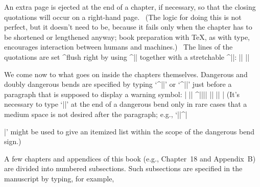 An extra page is ejected at the end of a chapter, if necessary, so
that the closing quotations will occur on a right-hand page. \ (The
logic for doing this is not perfect, but it doesn't need to be, because
it fails only when the chapter has to be shortened or lengthened anyway;
book preparation with \TeX, as with type, encourages interaction between
humans and machines.) \
The lines of the quotations are set ^{flush right} by using
^|\obeylines| together with a stretchable ^|\leftskip|:
\beginlines
|\outer\def\endchapter{\ifodd\pageno \else\vfill|^|\eject||\null\fi|
|  \begingroup\bigskip\vfill %
|  \def\eject{|^|\endgroup||\eject} %
|  \def\par{\ifhmode\/\endgraf\fi}\obeylines|
|  \def|^|\TeX||{T\kern-.2em\lower.5ex\hbox{E}X}|
|  \eightpoint \let\tt=\ninett \baselineskip=10pt |^|\interlinepenalty||=10000|
|  \leftskip=0pt plus 40pc minus \parindent |^|\parfillskip||=0pt|
|  \let|^|\rm||=\eightss \let|^|\sl||=\eightssi \everypar{\sl}}|
|\def\author#1(#2){\smallskip\noindent\rm--- #1|^|\unskip|^|\enspace||(#2)}|
\endlines

We come now to what goes on inside the chapters themselves. Dangerous and
doubly dangerous bends are specified by typing `^|\danger|' or `^|\ddanger|'
just before a paragraph that is supposed to display a warning symbol:
\beginlines
|\def\dbend{{\manual\char127}} %
|\def\d@nger{\medbreak|^|\begingroup|^|\clubpenalty||=10000|
|  \def\par{|^|\endgraf|^|\endgroup|^|\medbreak||} |%
  ^|\noindent|^|\hang|^|\hangafter||=-2|
|  \hbox to0pt{\hskip-\hangindent\dbend\hfill}|^|\ninepoint||}|
^|\outer||\def\danger{\d@nger}|
|\def\dd@nger{\medbreak\begingroup\clubpenalty=10000|
|  \def\par{\endgraf\endgroup\medbreak} \noindent\hang\hangafter=-2|
|  \hbox to0pt{\hskip-\hangindent\dbend\kern1pt\dbend\hfill}\ninepoint}|
|\outer\def\ddanger{\dd@nger}|
|\def\enddanger{\endgraf\endgroup} %
\endlines
(It's necessary to type `|\enddanger|' at the end of a dangerous bend
only in rare cases that a medium space is not desired after the paragraph;
e.g., `|\smallskip|^|\item|' might be used to give an itemized list within
the scope of the dangerous bend sign.)

A few chapters and appendices of this book (e.g., Chapter~18 and Appendix~B)
are divided into numbered subsections. Such subsections are specified
in the manuscript by typing, for example,
\begintt
